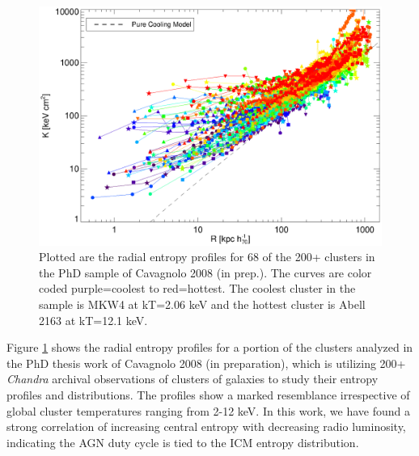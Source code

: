 \documentclass[letterpaper,11pt,twocolumn]{article}
\begin{document}
\begin{figure}[t]
\begin{minipage}[t]{0.9\linewidth}
\centering
\includegraphics[width=\textwidth, trim=28mm 10mm 30mm 17mm, clip]{splots}
\caption{
Plotted are the radial entropy profiles for 68 of the
200+ clusters in the PhD sample of Cavagnolo 2008 (in prep.). The
curves are color coded purple=coolest to red=hottest. The coolest cluster in
the sample is MKW4 at kT=2.06 keV and the hottest cluster is Abell
2163 at kT=12.1 keV.
}
\label{fig:ent}
\end{minipage}
\end{figure}

Figure \ref{fig:ent} shows the
radial entropy profiles for a portion of the clusters analyzed in the PhD
thesis work of Cavagnolo 2008 (in preparation), which is
utilizing 200+ {\textit{Chandra}} archival observations of clusters of
galaxies to study their entropy profiles and distributions. The
profiles show a marked resemblance irrespective of global cluster
temperatures ranging from 2-12 keV. In this work, we have found a
strong correlation of increasing central entropy with decreasing radio
luminosity, indicating the AGN duty cycle is tied to the ICM entropy
distribution.
\end{document}
